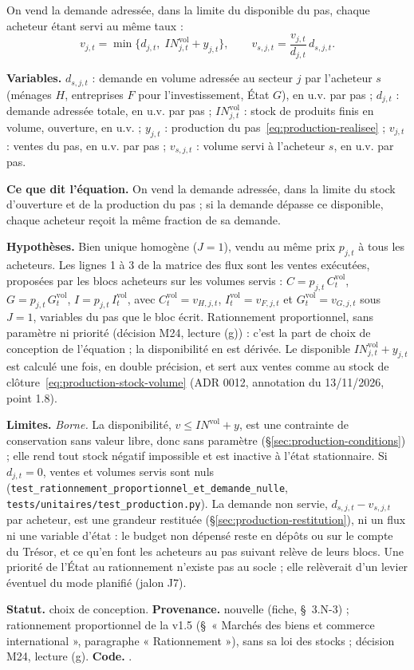 \documentclass[11pt,a4paper]{article}
\newcommand{\variables}{\par\noindent\textbf{Variables.} }
\newcommand{\sens}{\par\noindent\textbf{Ce que dit l'équation.} }
\newcommand{\hyp}{\par\noindent\textbf{Hypothèses.} }
\newcommand{\limites}{\par\noindent\textbf{Limites.} }
\newcommand{\code}[1]{\texttt{\detokenize{#1}}}
\newcommand{\tracabilite}[3]{\par\smallskip\noindent\textbf{Statut.} #1. \textbf{Provenance.} #2. \textbf{Code.} \code{#3}.}
\begin{document}
On vend la demande adressée, dans la limite du disponible du pas, chaque acheteur étant servi au même taux :
\begin{equation}\label{eq:production-ventes}
v_{j,t} = \min\bigl\{d_{j,t},\; \mathit{IN}^{\mathrm{vol}}_{j,t} + y_{j,t}\bigr\}, \qquad v_{s,j,t} = \frac{v_{j,t}}{d_{j,t}}\, d_{s,j,t} .
\end{equation}
\begin{lecture}
\variables $d_{s,j,t}$ : demande en volume adressée au secteur $j$ par l'acheteur $s$ (ménages $H$, entreprises $F$ pour l'investissement, État $G$), en u.v. par pas ; $d_{j,t}$ : demande adressée totale, en u.v. par pas ; $\mathit{IN}^{\mathrm{vol}}_{j,t}$ : stock de produits finis en volume, ouverture, en u.v. ; $y_{j,t}$ : production du pas~\eqref{eq:production-realisee} ; $v_{j,t}$ : ventes du pas, en u.v. par pas ; $v_{s,j,t}$ : volume servi à l'acheteur $s$, en u.v. par pas.
\sens On vend la demande adressée, dans la limite du stock d'ouverture et de la production du pas ; si la demande dépasse ce disponible, chaque acheteur reçoit la même fraction de sa demande.
\hyp Bien unique homogène ($J = 1$), vendu au même prix $p_{j,t}$ à tous les acheteurs. Les lignes 1 à 3 de la matrice des flux sont les ventes exécutées, proposées par les blocs acheteurs sur les volumes servis : $C = p_{j,t}\, C^{\mathrm{vol}}_t$, $G = p_{j,t}\, G^{\mathrm{vol}}_t$, $I = p_{j,t}\, I^{\mathrm{vol}}_t$, avec $C^{\mathrm{vol}}_t = v_{H,j,t}$, $I^{\mathrm{vol}}_t = v_{F,j,t}$ et $G^{\mathrm{vol}}_t = v_{G,j,t}$ sous $J = 1$, variables du pas que le bloc écrit. Rationnement proportionnel, sans paramètre ni priorité (décision M24, lecture (g)) : c'est la part de choix de conception de l'équation ; la disponibilité en est dérivée. Le disponible $\mathit{IN}^{\mathrm{vol}}_{j,t} + y_{j,t}$ est calculé une fois, en double précision, et sert aux ventes comme au stock de clôture~\eqref{eq:production-stock-volume} (ADR 0012, annotation du 13/11/2026, point 1.8).
\limites \emph{Borne.} La disponibilité, $v \le \mathit{IN}^{\mathrm{vol}} + y$, est une contrainte de conservation sans valeur libre, donc sans paramètre (\S\ref{sec:production-conditions}) ; elle rend tout stock négatif impossible et est inactive à l'état stationnaire. Si $d_{j,t} = 0$, ventes et volumes servis sont nuls (\nolinkurl{test_rationnement_proportionnel_et_demande_nulle}, \nolinkurl{tests/unitaires/test_production.py}). La demande non servie, $d_{s,j,t} - v_{s,j,t}$ par acheteur, est une grandeur restituée (\S\ref{sec:production-restitution}), ni un flux ni une variable d'état : le budget non dépensé reste en dépôts ou sur le compte du Trésor, et ce qu'en font les acheteurs au pas suivant relève de leurs blocs. Une priorité de l'État au rationnement n'existe pas au socle ; elle relèverait d'un levier éventuel du mode planifié (jalon J7).
\tracabilite{choix de conception}{nouvelle (fiche, \S~3.N-3) ; rationnement proportionnel de la v1.5 (\S~« Marchés des biens et commerce international », paragraphe « Rationnement »), sans sa loi des stocks ; décision M24, lecture (g)}{nations.blocs.production.ventes}
\end{lecture}
\end{document}
